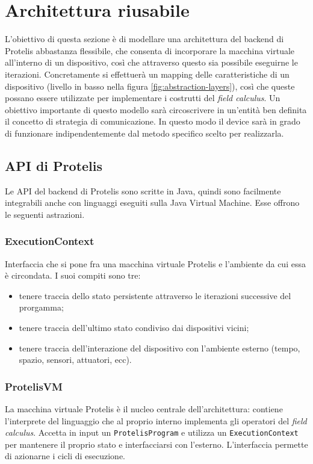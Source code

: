 \section{Architettura riusabile}
L'obiettivo di questa sezione è di modellare una architettura del backend di
Protelis abbastanza flessibile, che consenta di incorporare la macchina virtuale
all'interno di un dispositivo, così che attraverso questo sia possibile
eseguirne le iterazioni. Concretamente si effettuerà un mapping delle
caratteristiche di un dispositivo (livello in basso nella figura
\ref{fig:abstraction-layers}), così che queste possano essere utilizzate per
implementare i costrutti del \textit{field calculus}. Un obiettivo importante di
questo modello sarà circoscrivere in un'entità ben definita il concetto di
strategia di comunicazione. In questo modo il device sarà in grado di funzionare
indipendentemente dal metodo specifico scelto per realizzarla.

\subsection{API di Protelis}
Le API del backend di Protelis sono scritte in Java, quindi sono facilmente
integrabili anche con linguaggi eseguiti sulla Java Virtual Machine. Esse
offrono le seguenti astrazioni.

\subsubsection{ExecutionContext}
Interfaccia che si pone fra una macchina virtuale Protelis e l'ambiente da cui
essa è circondata. I suoi compiti sono tre:
\begin{itemize}
\item tenere traccia dello stato persistente attraverso le iterazioni successive
  del prorgamma;
\item tenere traccia dell'ultimo stato condiviso dai dispositivi vicini;
\item tenere traccia dell'interazione del dispositivo con l'ambiente esterno
  (tempo, spazio, sensori, attuatori, ecc).
\end{itemize}

\subsubsection{ProtelisVM}
La macchina virtuale Protelis è il nucleo centrale dell'architettura: contiene
l'interprete del linguaggio che al proprio interno implementa gli operatori del
\textit{field calculus}. Accetta in input un \texttt{ProtelisProgram} e utilizza un
\texttt{ExecutionContext} per mantenere il proprio stato e interfacciarsi con
l'esterno. L'interfaccia permette di azionarne i cicli di esecuzione.

